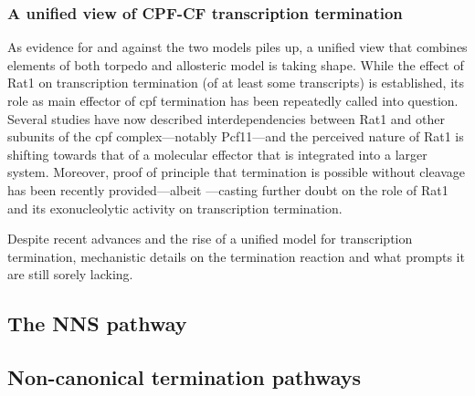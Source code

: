\subsubsection{A unified view of CPF-CF transcription termination}

As evidence for and against the two models piles up, a unified view that combines elements of both torpedo and allosteric model is taking shape.
While the effect of Rat1 on transcription termination (of at least some transcripts) is established, its role as main effector of \gls{cpf} termination has been repeatedly called into question.
Several studies have now described interdependencies between Rat1 and other subunits of the \gls{cpf} complex---notably Pcf11---and the perceived nature of Rat1 is shifting towards that of a molecular effector  that is integrated into a larger system.
Moreover, proof of principle that termination is possible without cleavage has been recently provided---albeit \invitro{}---casting further doubt on the role of Rat1 and its exonucleolytic activity on transcription termination.

Despite recent advances and the rise of a unified model for transcription termination, mechanistic details on the termination reaction and what prompts it are still sorely lacking.



\subsection{The NNS pathway}



\subsection{Non-canonical termination pathways}